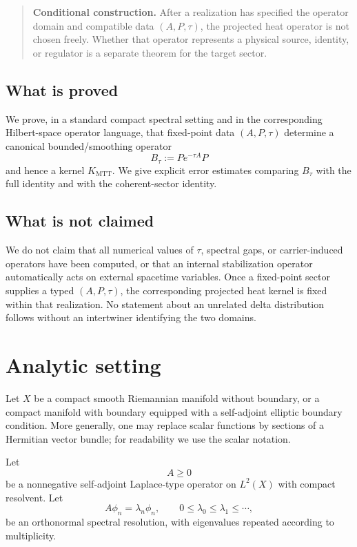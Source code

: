 \documentclass[11pt]{article}
\begin{document}
\begin{quote}
\textbf{Conditional construction.}
After a realization has specified the operator domain and compatible data
\((A,P,\tau)\), the projected heat operator is not chosen freely.  Whether
that operator represents a physical source, identity, or regulator is a
separate theorem for the target sector.
\end{quote}

\subsection*{What is proved}

We prove, in a standard compact spectral setting and in the corresponding Hilbert-space
operator language, that fixed-point data \((A,P,\tau)\) determine a canonical bounded/smoothing
operator
\[
        B_\tau:=P e^{-\tau A}P
\]
and hence a kernel \(K_{\mathrm{MTT}}\). We give explicit error estimates comparing \(B_\tau\)
with the full identity and with the coherent-sector identity.

\subsection*{What is not claimed}

We do not claim that all numerical values of \(\tau\), spectral gaps, or
carrier-induced operators have been computed, or that an internal
stabilization operator automatically acts on external spacetime variables.
Once a fixed-point sector supplies a typed \((A,P,\tau)\), the corresponding
projected heat kernel is fixed within that realization.  No statement about
an unrelated delta distribution follows without an intertwiner identifying
the two domains.

\section{Analytic setting}

Let \(X\) be a compact smooth Riemannian manifold without boundary, or a compact manifold
with boundary equipped with a self-adjoint elliptic boundary condition. More generally, one
may replace scalar functions by sections of a Hermitian vector bundle; for readability we use
the scalar notation.

Let
\[
        A\ge 0
\]
be a nonnegative self-adjoint Laplace-type operator on \(L^2(X)\) with compact resolvent.
Let
\[
        A\phi_n=\lambda_n\phi_n,\qquad
        0\le \lambda_0\le \lambda_1\le \cdots,
\]
be an orthonormal spectral resolution, with eigenvalues repeated according to multiplicity.
\end{document}
